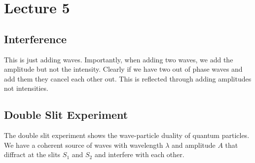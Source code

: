 \documentclass{report}
\numberwithin{equation}{section}
\begin{document}
\section{Lecture 5}
\subsection{Interference}
This is just adding waves. Importantly, when adding two waves, we add the amplitude but not the intensity. Clearly if we have two out of phase waves and add them they cancel each other out. This is reflected through adding amplitudes not intensities.
\subsection{Double Slit Experiment}
The double slit experiment shows the wave-particle duality of quantum particles. We have a coherent source of waves with wavelength $\lambda$ and amplitude $A$ that diffract at the slits $S_1$ and $S_2$ and interfere with each other.
\end{document}
